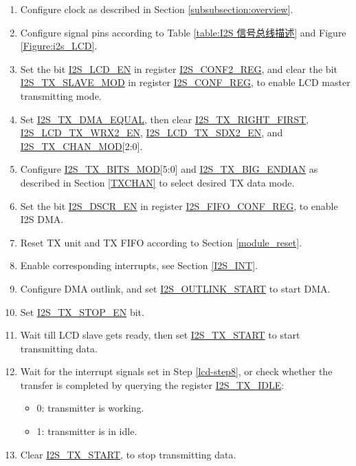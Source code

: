 \documentclass[main\_\_EN.tex]{subfiles}
\begin{document}
\begin{enumerate}

    \item Configure clock as described in Section \ref{subsubsection:overview}.

    \item Configure signal pins according to Table \ref{table:I2S 信号总线描述} and Figure  \ref{Figure:i2s_LCD}.

    \item Set the bit \hyperref[fielddesc:I2SLCDEN]{I2S\_LCD\_EN} in register \hyperref[regdesc:I2SCONF2REG]{I2S\_CONF2\_REG}, and clear the bit \hyperref[fielddesc:I2STXSLAVEMOD]{I2S\_TX\_SLAVE\_MOD} in register \hyperref[regdesc:I2SCONFREG]{I2S\_CONF\_REG}, to enable LCD master transmitting mode.

    \item Set \hyperref[fielddesc:I2STXDMAEQUAL]{I2S\_TX\_DMA\_EQUAL}, then clear \hyperref[fielddesc:I2STXRIGHTFIRST]{I2S\_TX\_RIGHT\_FIRST}, \hyperref[fielddesc:I2SLCDTXWRX2EN]{I2S\_LCD\_TX\_WRX2\_EN}, \hyperref[fielddesc:I2SLCDTXSDX2EN]{I2S\_LCD\_TX\_SDX2\_EN}, and \hyperref[fielddesc:I2STXCHANMOD]{I2S\_TX\_CHAN\_MOD}[2:0].

    \item Configure \hyperref[fielddesc:I2STXBITSMOD]{I2S\_TX\_BITS\_MOD}[5:0] and \hyperref[fielddesc:I2STXBIGENDIAN]{I2S\_TX\_BIG\_ENDIAN} as described in Section \ref{TXCHAN} to select desired TX data mode.

    \item Set the bit \hyperref[fielddesc:I2SDSCREN]{I2S\_DSCR\_EN} in register \hyperref[regdesc:I2SFIFOCONFREG]{I2S\_FIFO\_CONF\_REG}, to enable I2S DMA.

    \item Reset TX unit and TX FIFO according to Section \ref{module_reset}.

    \item Enable corresponding interrupts, see Section \ref{I2S_INT}. \label{lcd-step8}

    \item Configure DMA outlink, and set \hyperref[fielddesc:I2SOUTLINKSTART]{I2S\_OUTLINK\_START} to start DMA.
    \item Set \hyperref[fielddesc:I2STXSTOPEN]{I2S\_TX\_STOP\_EN} bit.
    \item Wait till LCD slave gets ready, then set \hyperref[fielddesc:I2STXSTART]{I2S\_TX\_START} to start transmitting data.
    \item Wait for the interrupt signals set in Step \ref{lcd-step8}, or check whether the transfer is completed by querying the register \hyperref[fielddesc:I2STXIDLE]{I2S\_TX\_IDLE}:
    \begin{itemize}
        \item 0: transmitter is working.
        \item 1: transmitter is in idle.
    \end{itemize}
    \item Clear \hyperref[fielddesc:I2STXSTART]{I2S\_TX\_START}, to stop transmitting data.

\end{enumerate}
\end{document}
